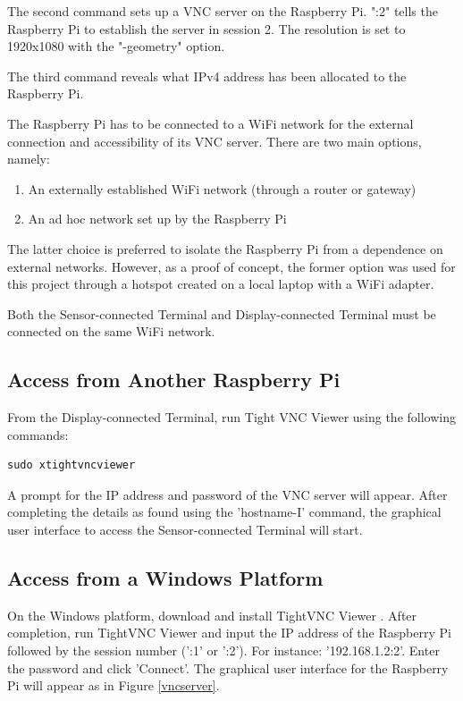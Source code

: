 The second command sets up a VNC server on the Raspberry Pi. ":2" tells the Raspberry Pi to establish the server in session 2. The resolution is set to 1920x1080 with the "-geometry" option. 

The third command reveals what IPv4 address has been allocated to the Raspberry Pi. 

The Raspberry Pi has to be connected to a WiFi network for the external connection and accessibility of its VNC server. There are two main options, namely: 

\begin{enumerate}
	\item An externally established WiFi network (through a router or gateway)
	\item An ad hoc network set up by the Raspberry Pi
\end{enumerate}

The latter choice is preferred to isolate the Raspberry Pi from a dependence on external networks. However, as a proof of concept, the former option was used for this project through a hotspot created on a local laptop with a WiFi adapter. 

Both the Sensor-connected Terminal and Display-connected Terminal must be connected on the same WiFi network. 

\subsection{Access from Another Raspberry Pi}

From the Display-connected Terminal, run Tight VNC Viewer using the following commands: 

\begin{lstlisting}
sudo xtightvncviewer
\end{lstlisting}

A prompt for the IP address and password of the VNC server will appear. After completing the details as found using the 'hostname-I' command, the graphical user interface to access the Sensor-connected Terminal will start. 

\subsection{Access from a Windows Platform}
\label{wvsmswindows}

On the Windows platform, download and install TightVNC Viewer \cite{windowstightvnc}. After completion, run TightVNC Viewer and input the IP address of the Raspberry Pi followed by the session number (':1' or ':2'). For instance: '192.168.1.2:2'. Enter the password and click 'Connect'. The graphical user interface for the Raspberry Pi will appear as in Figure \ref{vncserver}. 


